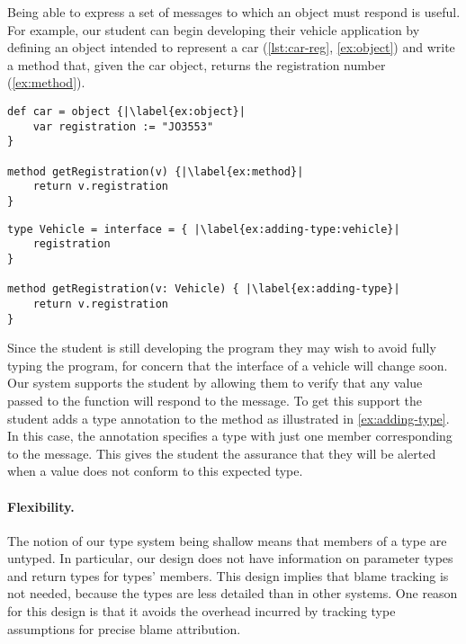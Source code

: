 Being able to express a set of messages to which an object
must respond is useful. For example, our student can begin
developing their vehicle application
by defining an object
intended to represent a car (\cref{lst:car-reg}, \cref{ex:object}) and write a method that, 
given the car object,
returns the registration number (\cref{ex:method}).


\begin{lstlisting}[caption={The start of a simple program for tracking vehicle information.},label=lst:car-reg,escapechar=|,float,floatplacement=htbp]
def car = object {|\label{ex:object}|
    var registration := "JO3553"
}

method getRegistration(v) {|\label{ex:method}|
    return v.registration
}
\end{lstlisting}


\begin{lstlisting}[label={ex:vehicle},caption={Adding a type annotation to a method parameter.},escapechar=|,float,floatplacement=htbp]
type Vehicle = interface = { |\label{ex:adding-type:vehicle}|
    registration    
}

method getRegistration(v: Vehicle) { |\label{ex:adding-type}|
    return v.registration
}
\end{lstlisting}

Since the student is still developing the program they 
may wish to avoid fully typing the program,  
for concern that the interface of a vehicle will change soon. 
Our system supports the student by allowing them to verify
that any value passed to the  function will respond
to the  message.
To get this support the student adds a type annotation to the method 
as illustrated in \cref{ex:adding-type}. 
In this case, 
the annotation specifies a type with just one member
corresponding to the  message.
This gives the student the assurance that they will be alerted when a value 
does not conform to this expected type.


\paragraph{Flexibility.}

The notion of our type system being shallow means 
that members of a type are untyped.
In particular, our design does not have information on parameter types
and return types for types' members.
This design implies that blame tracking is not needed,
because the types are less detailed than in other systems.
One reason for this design is that it avoids the overhead incurred
by tracking type assumptions for precise blame attribution.


